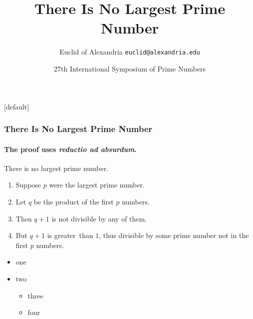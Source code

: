 \documentclass[hyperref={pdfpagelabels=false}]{beamer}
\title{There Is No Largest Prime Number}
\date[ISPN ’80]{27th International Symposium of Prime Numbers}
\author[Euclid]{Euclid of Alexandria \texttt{euclid@alexandria.edu}}
\begin{document}
\begin{frame}
\titlepage
\end{frame}
[default]


\begin{frame}
\frametitle{There Is No Largest Prime Number} 
\framesubtitle{The proof uses \textit{reductio ad absurdum}.} 
\begin{theorem}
There is no largest prime number.  \end{theorem} 
\begin{enumerate} 
\item<1-| alert@1> Suppose $p$ were the largest prime number. 
\item<2-> Let $q$ be the product of the first $p$ numbers. 
\item<3-> Then $q+1$ is not divisible by any of them. 
\item<1-> But $q + 1$ is \color{KIOSred}greater\color{KIOSgray}\ than $1$, thus divisible by some prime
number not in the first $p$ numbers.

\end{enumerate}

\begin{itemize}
	\item one
	\item two \begin{itemize}
		\item three
		\item four
	\end{itemize}
\end{itemize} 
\end{frame}
\end{document}

